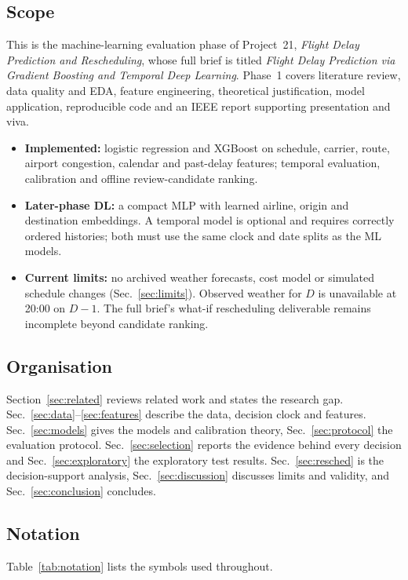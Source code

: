\documentclass[conference]{IEEEtran}
\begin{document}
\subsection{Scope}
This is the machine-learning evaluation phase of Project~21, \emph{Flight Delay Prediction and Rescheduling}, whose full brief is titled \emph{Flight Delay Prediction via Gradient Boosting and Temporal Deep Learning}. Phase~1 covers literature review, data quality and EDA, feature engineering, theoretical justification, model application, reproducible code and an IEEE report supporting presentation and viva.
\begin{itemize}
\item \textbf{Implemented:} logistic regression and XGBoost on schedule, carrier, route, airport congestion, calendar and past-delay features; temporal evaluation, calibration and offline review-candidate ranking.
\item \textbf{Later-phase DL:} a compact MLP with learned airline, origin and destination embeddings. A temporal model is optional and requires correctly ordered histories; both must use the same clock and date splits as the ML models.
\item \textbf{Current limits:} no archived weather forecasts, cost model or simulated schedule changes (Sec.~\ref{sec:limits}). Observed weather for $D$ is unavailable at 20:00 on $D-1$. The full brief's what-if rescheduling deliverable remains incomplete beyond candidate ranking.
\end{itemize}

\subsection{Organisation}
Section~\ref{sec:related} reviews related work and states the research gap. Sec.~\ref{sec:data}--\ref{sec:features} describe the data, decision clock and features. Sec.~\ref{sec:models} gives the models and calibration theory, Sec.~\ref{sec:protocol} the evaluation protocol. Sec.~\ref{sec:selection} reports the evidence behind every decision and Sec.~\ref{sec:exploratory} the exploratory test results. Sec.~\ref{sec:resched} is the decision-support analysis, Sec.~\ref{sec:discussion} discusses limits and validity, and Sec.~\ref{sec:conclusion} concludes.

\subsection{Notation}
Table~\ref{tab:notation} lists the symbols used throughout.
\end{document}
